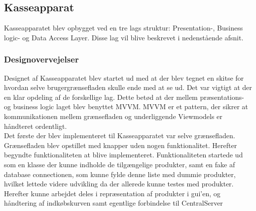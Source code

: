 \subsection{Kasseapparat}

Kasseapparatet blev opbygget ved en tre lags struktur: Presentation-, Business logic- og Data Access Layer. Disse lag vil blive beskrevet i nedenstående afsnit.

\subsubsection{Designovervejelser}
Designet af Kasseapparatet blev startet ud med at der blev tegnet en skitse for hvordan selve brugergrænsefladen skulle ende med at se ud.
Det var vigtigt at der en klar opdeling af de forskellige lag. Dette betød at der mellem præsentations- og business logic laget blev benyttet MVVM. MVVM er et pattern, der sikrer at kommunikationen mellem grænsefladen og underliggende Viewmodels er håndteret ordentligt. \\
Det første der blev implementeret til Kasseapparatet var selve grænsefladen. Grænsefladen blev opstillet med knapper uden nogen funktionalitet. Herefter begyndte funktionaliteten at blive implementeret. Funktionaliteten startede ud som en klasse der kunne indholde de tilgængelige produkter, samt en fake af database connectionen, som kunne fylde denne liste med dummie produkter, hvilket lettede videre udvikling da der allerede kunne testes med produkter. Herefter kunne arbejdet deles i repræsentation af produkter i gui'en, og håndtering af indkøbskurven samt egentlige forbindelse til CentralServer





